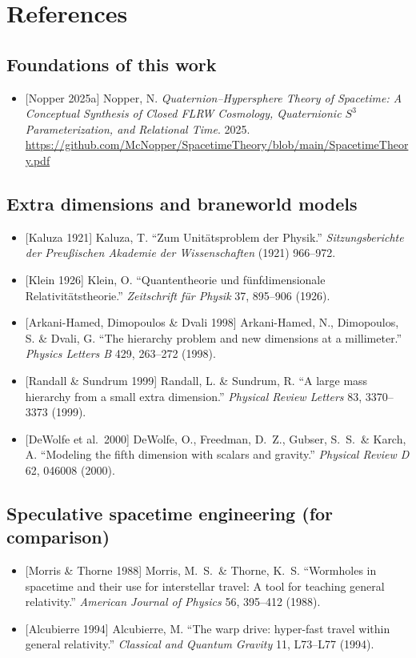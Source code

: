 \documentclass[11pt,a4paper]{article}
\begin{document}
\section*{References}

\subsection*{Foundations of this work}
\begin{itemize}[leftmargin=*]
\item {[Nopper 2025a]} Nopper, N. \emph{Quaternion--Hypersphere Theory of Spacetime: A Conceptual Synthesis of Closed FLRW Cosmology, Quaternionic $S^3$ Parameterization, and Relational Time}. 2025. \url{https://github.com/McNopper/SpacetimeTheory/blob/main/SpacetimeTheory.pdf}
\end{itemize}

\subsection*{Extra dimensions and braneworld models}
\begin{itemize}[leftmargin=*]
\item {[Kaluza 1921]} Kaluza, T. ``Zum Unit\"atsproblem der Physik.'' \emph{Sitzungsberichte der Preu{\ss}ischen Akademie der Wissenschaften} (1921) 966--972.
\item {[Klein 1926]} Klein, O. ``Quantentheorie und f\"unfdimensionale Relativit\"atstheorie.'' \emph{Zeitschrift f\"ur Physik} 37, 895--906 (1926).
\item {[Arkani-Hamed, Dimopoulos \& Dvali 1998]} Arkani-Hamed, N., Dimopoulos, S. \& Dvali, G. ``The hierarchy problem and new dimensions at a millimeter.'' \emph{Physics Letters B} 429, 263--272 (1998).
\item {[Randall \& Sundrum 1999]} Randall, L. \& Sundrum, R. ``A large mass hierarchy from a small extra dimension.'' \emph{Physical Review Letters} 83, 3370--3373 (1999).
\item {[DeWolfe et al.\ 2000]} DeWolfe, O., Freedman, D.~Z., Gubser, S.~S.\ \& Karch, A. ``Modeling the fifth dimension with scalars and gravity.'' \emph{Physical Review D} 62, 046008 (2000).
\end{itemize}

\subsection*{Speculative spacetime engineering (for comparison)}
\begin{itemize}[leftmargin=*]
\item {[Morris \& Thorne 1988]} Morris, M.~S.\ \& Thorne, K.~S. ``Wormholes in spacetime and their use for interstellar travel: A tool for teaching general relativity.'' \emph{American Journal of Physics} 56, 395--412 (1988).
\item {[Alcubierre 1994]} Alcubierre, M. ``The warp drive: hyper-fast travel within general relativity.'' \emph{Classical and Quantum Gravity} 11, L73--L77 (1994).
\end{itemize}
\end{document}
